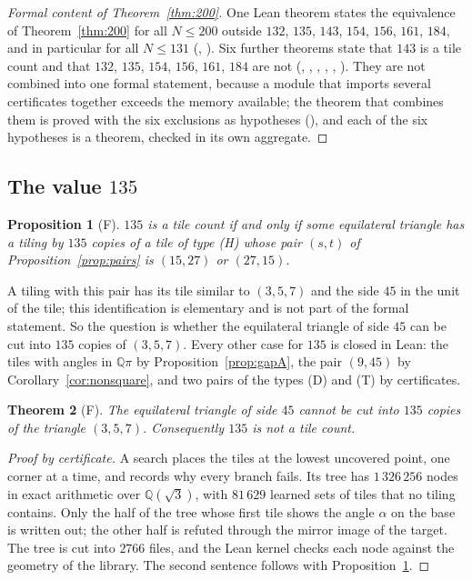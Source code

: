 \documentclass[11pt,reqno]{amsart}
\theoremstyle{plain}
\newtheorem{theorem}{Theorem}[section]
\newtheorem{proposition}[theorem]{Proposition}
\theoremstyle{definition}
\newcommand{\Q}{\mathbb{Q}}
\newcommand{\sF}{\textup{\textsf{F}}}
\begin{document}
\begin{proof}[Formal content of Theorem~\ref{thm:200}]
One Lean theorem states the equivalence of Theorem~\ref{thm:200} for all $N\le200$ outside $132$, $135$,
$143$, $154$, $156$, $161$, $184$, and in particular for all $N\le131$
(, ). Six further theorems state that
$143$ is a tile count and that $132$, $135$, $154$, $156$, $161$, $184$ are not
(, , ,
, , ). They are
not combined into one formal statement, because a module that imports several certificates together exceeds the
memory available; the theorem that combines them is proved with the six exclusions as hypotheses
(), and each of the six hypotheses is a theorem, checked in its
own aggregate.
\end{proof}

\subsection{The value $135$}

\begin{proposition}[\sF]\label{prop:n135}
$135$ is a tile count if and only if some equilateral triangle has a tiling by $135$ copies of a tile of
type \textup{(H)} whose pair $(s,t)$ of Proposition~\ref{prop:pairs} is $(15,27)$ or $(27,15)$.
\end{proposition}

A tiling with this pair has its tile similar to $(3,5,7)$ and the side $45$ in the unit of the tile; this
identification is elementary and is not part of the formal statement. So the question is whether the
equilateral triangle of side $45$ can be cut into $135$ copies of $(3,5,7)$. Every other case for $135$ is
closed in Lean: the tiles with angles in $\Q\pi$ by Proposition~\ref{prop:gapA}, the pair $(9,45)$ by
Corollary~\ref{cor:nonsquare}, and two pairs of the types (D) and (T) by certificates.

\begin{theorem}[\sF]\label{thm:n135}
The equilateral triangle of side $45$ cannot be cut into $135$ copies of the triangle $(3,5,7)$. Consequently
$135$ is not a tile count.
\end{theorem}

\begin{proof}[Proof by certificate]
A search places the tiles at the lowest uncovered point, one corner at a time, and records why every branch
fails. Its tree has $1\,326\,256$ nodes in exact arithmetic over $\Q(\sqrt3)$, with $81\,629$ learned sets of tiles
that no tiling contains. Only the half of the tree whose first tile shows the angle $\alpha$ on the base is written
out; the other half is refuted through the mirror image of the target. The tree is cut into $2766$ files, and the
Lean kernel checks each node against the geometry of the library. The second sentence follows with Proposition~\ref{prop:n135}.
\end{proof}
\end{document}
